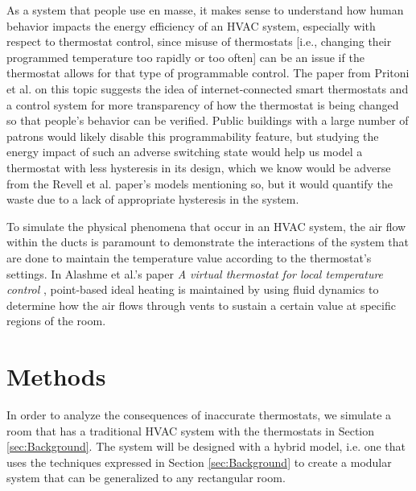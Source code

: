 \documentclass[conference,letterpaper]{IEEEtran}
\begin{document}
As a system that people use en masse, it makes sense to understand how human behavior impacts the energy efficiency of an HVAC system, especially with respect to thermostat control, since misuse of thermostats [i.e., changing their programmed temperature too rapidly or too often] can be an issue if the thermostat allows for that type of programmable control. The paper from Pritoni et al. on this topic \cite{pritoni_energy_2015} suggests the idea of internet-connected smart thermostats and a control system for more transparency of how the thermostat is being changed so that people's behavior can be verified. Public buildings with a large number of patrons would likely disable this programmability feature, but studying the energy impact of such an adverse switching state would help us model a thermostat with less hysteresis in its design, which we know would be adverse from the Revell et al. paper's models mentioning so, but it would quantify the waste due to a lack of appropriate hysteresis in the system.  

To simulate the physical phenomena that occur in an HVAC system, the air flow within the ducts is paramount to demonstrate the interactions of the system that are done to maintain the temperature value according to the thermostat's settings. In Alashme et al.'s paper \textit{A virtual thermostat for local temperature control} \cite{alhashme_virtual_2016}, point-based ideal heating is maintained by using fluid dynamics to determine how the air flows through vents to sustain a certain value at specific regions of the room.  

\section{Methods}
\label{sec:Methods}
In order to analyze the consequences of inaccurate thermostats, we simulate a room that has a traditional HVAC system with the thermostats in Section \ref{sec:Background}. The system will be designed with a hybrid model, i.e. one that uses the techniques expressed in Section \ref{sec:Background} to create a modular system that can be generalized to any rectangular room. 
\end{document}
